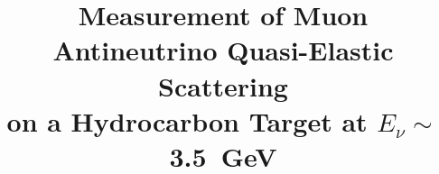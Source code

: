 \documentclass[aps,prl,twocolumn,showpacs,superscriptaddress,nofootinbib]{revtex4}
\newcommand{\dsdq}{\ensuremath{d\sigma/dQ^2}\xspace}
\begin{document}
\title{Measurement of Muon Antineutrino Quasi-Elastic Scattering \\ on a Hydrocarbon Target at $E_{\nu} \sim$ 3.5~GeV} 



\newcommand{\deceased}{Deceased}

\newcommand{\wroclaw}{Institute of Theoretical Physics, Wroc\l aw University, Wroc\l aw, Poland}    


\end{document}
